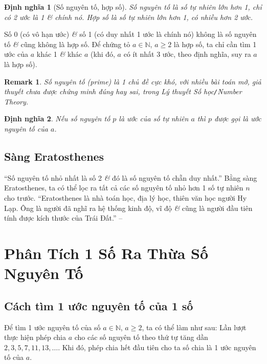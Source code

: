 \documentclass[oneside]{book}
\numberwithin{equation}{section}
\newtheorem{dinhnghia}{Định nghĩa}[section]
\newtheorem{remark}{Remark}[section]
\begin{document}
\begin{dinhnghia}[Số nguyên tố, hợp số]
	\emph{Số nguyên tố} là số tự nhiên lớn hơn 1, chỉ có 2 ước là 1 \textit{\&} chính nó. \emph{Hợp số} là số tự nhiên lớn hơn 1, có nhiều hơn 2 ước.
\end{dinhnghia}
Số 0 (có vô hạn ước) \textit{\&} số 1 (có duy nhất 1 ước là chính nó) không là số nguyên tố \textit{\&} cũng không là hợp số. Để chứng tỏ $a\in\mathbb{N}$, $a\ge 2$ là hợp số, ta chỉ cần tìm 1 ước của $a$ khác 1 \textit{\&} khác $a$ (khi đó, $a$ có ít nhất 3 ước, theo định nghĩa, suy ra $a$ là hợp số).

\begin{remark}
	Số nguyên tố (prime) là 1 chủ đề cực khó, với nhiều bài toán mở, giả thuyết chưa được chứng minh đúng hay sai, trong Lý thuyết Số học\emph{\texttt{/}}Number Theory.
\end{remark}

\begin{dinhnghia}
	Nếu số nguyên tố $p$ là ước của số tự nhiên $a$ thì $p$ được gọi là \emph{ước nguyên tố} của $a$.
\end{dinhnghia}

\subsection{Sàng Eratosthenes}
``Số nguyên tố nhỏ nhất là số 2 \textit{\&} đó là số nguyên tố chẵn duy nhất.'' Bằng sàng Eratosthenes, ta có thể lọc ra tất cả các số nguyên tố nhỏ hơn 1 số tự nhiên $n$ cho trước. ``Eratosthenes là nhà toán học, địa lý học, thiên văn học người Hy Lạp. Ông là người đã nghĩ ra hệ thống kinh độ, vĩ độ \textit{\&} cũng là người đầu tiên tính được kích thước của Trái Đất.'' -- \cite[p. 43]{Thai_Anh_Dat_Ha_Loan_Nam_Quang_Toan_6_tap_1}

\section{Phân Tích 1 Số Ra Thừa Số Nguyên Tố}

\subsection{Cách tìm 1 ước nguyên tố của 1 số}
\begin{tcolorbox}
	Để tìm 1 ước nguyên tố của số $a\in\mathbb{N}$, $a\ge 2$, ta có thể làm như sau: Lần lượt thực hiện phép chia $a$ cho các số nguyên tố theo thứ tự tăng dần $2,3,5,7,11,13,\ldots$. Khi đó, phép chia hết đầu tiên cho ta số chia là 1 ước nguyên tố của $a$.
\end{tcolorbox}
\end{document}
